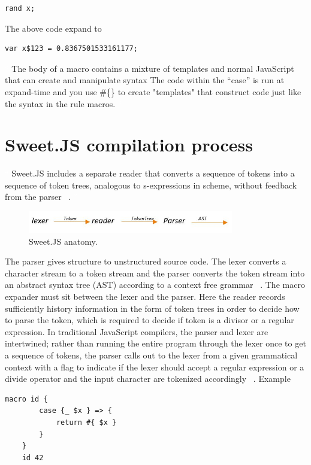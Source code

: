 \begin{enumerate}
\begin{lstlisting}[frame=single]
rand x;
\end{lstlisting}

The above code expand to

\begin{lstlisting}[frame=single]
	var x$123 = 0.8367501533161177;
\end{lstlisting}
\textcolor{white}{``}
The body of a macro contains a mixture of templates and normal JavaScript that can create and manipulate syntax
The code within the ``case'' is run at expand-time and you use \#\{\} to create "templates" that construct code just like the syntax in the rule macros.
\textcolor{white}{''}
\end{enumerate}

\section{Sweet.JS compilation process}
\textcolor{white}{``}
Sweet.JS includes a separate reader that converts a sequence of tokens into a sequence of token trees, analogous to s-expressions in scheme, without feedback from the parser ~\cite{bib2}.
\textcolor{white}{''}
\begin{figure}[htb]
\centering
\includegraphics[width=0.8\textwidth]{images/Tokenizer.jpg}
\caption{Sweet.JS anatomy.} 
\label{fig:Tokenizer}
\end{figure}

The parser gives structure to unstructured source code. The lexer converts a character stream to a token stream and the parser converts the token stream into an abstract syntax tree (AST) according to a context free grammar ~\cite{bib2}. The macro expander  must sit between the lexer and the parser. Here the reader records sufficiently history information in the form of token trees in order to decide how to parse the token, which is required to decide if token is a divisor or a regular expression.
In traditional JavaScript compilers, the parser and lexer are intertwined; rather than running the entire program through the lexer once to get a sequence of tokens, the parser calls out to the lexer from a given grammatical context with a flag to indicate if the lexer should accept a regular expression or a divide operator and the input character are tokenized accordingly ~\cite{bib2}.
\newpage
Example

\begin{lstlisting}[frame=single]
	macro id {
  		case {_ $x } => {
   			return #{ $x }
  		}
	}
	id 42
\end{lstlisting}

